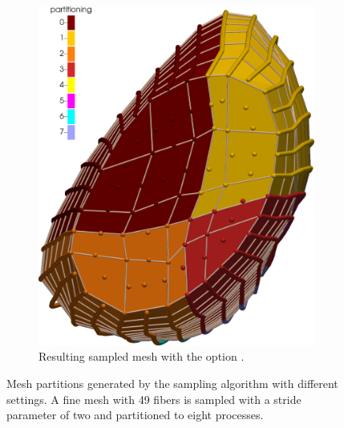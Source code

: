 \begin{figure}
\begin{subfigure}[t]{0.48\textwidth}
    \includegraphics[width=\textwidth]{images/implementation/partitioning3.png}
    \caption{Resulting sampled mesh with the option .}%
    \label{fig:partitioning3}%
  \end{subfigure}
  \caption{Mesh partitions generated by the sampling algorithm with different settings. A fine mesh with 49 fibers is sampled with a stride parameter of two and partitioned to eight processes.}%
  \label{fig:partitioning3_4}%
\end{figure}%


